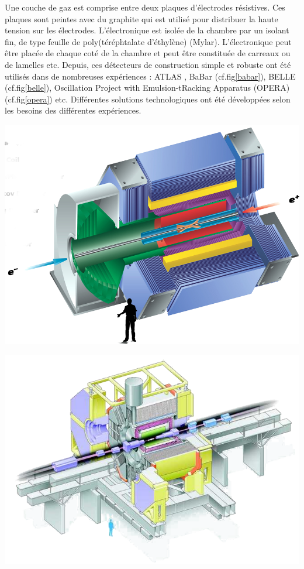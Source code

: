 Une couche de gaz est comprise entre deux plaques d'électrodes résistives. Ces plaques sont peintes avec du graphite qui est utilisé pour distribuer la haute tension sur les électrodes. L'électronique est isolée de la chambre par un isolant fin, de type feuille de poly(téréphtalate d'éthylène) (Mylar). L'électronique peut être placée de chaque coté de la chambre et peut être constituée de carreaux ou de lamelles etc.
Depuis, ces détecteurs de construction simple et robuste ont été utilisés dans de nombreuses expériences : ATLAS \cite{ATLAS}, BaBar \cite{Boutigny:1995ib} (cf.fig\ref{babar}), BELLE \cite{ABASHIAN2002117} (cf.fig\ref{belle}),  Oscillation Project with Emulsion-tRacking Apparatus (OPERA) \cite{1748-0221-9-10-C10003} (cf.fig\ref{opera}) etc. Différentes solutions technologiques ont été développées selon les besoins des différentes expériences.

\marginpar
{
	\centering
	\includegraphics[width=\marginparwidth]{RPC/babar.png}
	\label{babar}
}

\marginpar
{
	\centering
	\includegraphics[width=\marginparwidth]{RPC/belle.png}
	\label{belle}
}

